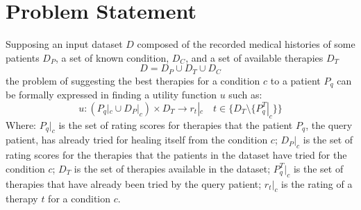 \section{Problem Statement}
Supposing an input dataset $D$ composed of the recorded medical histories of
some patients $D_P$, a set of known condition, $D_C$, and a set of available
therapies $D_T$
\begin{equation}
		D = D_P \cup D_T \cup D_C
\end{equation}
the problem of suggesting the best therapies for a condition $c$ to a patient
$P_q$ can be formally expressed in finding a utility function $u$ such as:
\begin{equation}
		u: (P_{q}|_{c} \cup D_{P}|_{c}) \times D_{T} \to r_{t}|_{c}
        \quad t \in \{D_{T}\setminus\{P^{T}_{q}|_{c}\}\}
\end{equation}
Where: $P_{q}|_{c}$ is the set of rating scores for therapies that the patient
$P_q$, the query patient, has already tried for healing itself from
the condition $c$;
$D_{P}|_{c}$ is the set of rating scores for the therapies that the patients in
the dataset have tried for the condition $c$;
$D_{T}$ is the set of therapies available in the dataset;
$P^{T}_{q}|_{c}$ is the set of therapies that have already been tried by the
query patient;
$r_{t}|_{c}$ is the rating of a therapy $t$ for a condition $c$.
